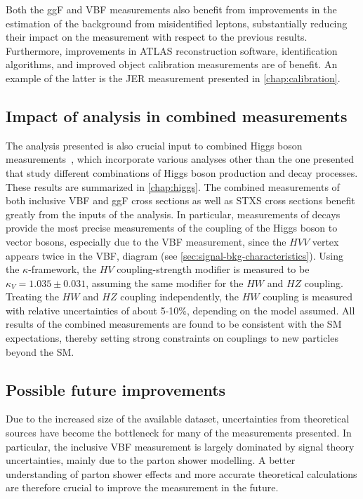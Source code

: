 Both the ggF and VBF measurements also benefit from improvements in the estimation of the background from misidentified leptons, substantially reducing their impact on the measurement with respect to the previous results. 
Furthermore, improvements in ATLAS reconstruction software, identification algorithms, and improved object calibration measurements are of benefit. 
An example of the latter is the JER measurement presented in \cref{chap:calibration}. 

\subsection{Impact of analysis in combined measurements}
The analysis presented is also crucial input to combined Higgs boson measurements~\cite{NaturePaper}, which incorporate various analyses other than the one presented that study different combinations of Higgs boson production and decay processes. These results are summarized in \cref{chap:higgs}.
The combined measurements of both inclusive VBF and ggF cross sections as well as STXS cross sections benefit greatly from the inputs of the \HWW analysis.
In particular, measurements of \HWW decays provide the most precise measurements of the coupling of the Higgs boson to vector bosons, especially due to the VBF measurement, since the $HVV$ vertex appears twice in the VBF, \HWW diagram (see \cref{sec:signal-bkg-characteristics}). 
Using the $\kappa$-framework, the $HV$ coupling-strength modifier is measured to be $\kappa_{V} = 1.035 \pm 0.031$, assuming the same modifier for the $HW$ and $HZ$ coupling.
Treating the $HW$ and $HZ$ coupling independently, the $HW$ coupling is measured with relative uncertainties of about 5-10\%, depending on the model assumed. 
All results of the combined measurements are found to be consistent with the SM expectations, thereby setting strong constraints on couplings to new particles beyond the SM.  

\subsection{Possible future improvements}
Due to the increased size of the available dataset, uncertainties from theoretical sources have become the bottleneck for many of the \HWW measurements presented.
In particular, the inclusive VBF measurement is largely dominated by signal theory uncertainties, mainly due to the parton shower modelling.
A better understanding of parton shower effects and more accurate theoretical calculations are therefore crucial to improve the measurement in the future.~\cite{Jger2020} 


